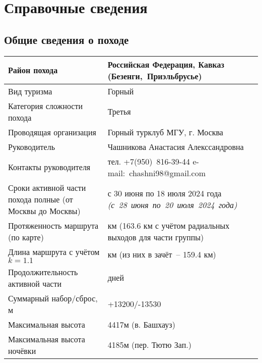 \section{Справочные сведения}\label{sec:general_information}
	\subsection{Общие сведения о походе}\label{subsec:general_information}
		\begin{longtable}{|>{\centering\arraybackslash} m{6.1cm}|>{\centering\arraybackslash} m{10cm}|} \hline
			Район похода														&	Российская Федерация, Кавказ (Безенги,~Приэльбрусье)						\\ \hline
			Вид туризма															&	Горный																		\\ \hline
			Категория сложности похода											&	Третья																		\\ \hline
			Проводящая организация												&	Горный турклуб МГУ, г. Москва												\\ \hline
			Руководитель														&	Чашникова Анастасия Алекссандровна 											\\ \hline
			Контакты руководителя												&	тел. +7(950)~816-39-44 e-mail:~chashni98@gmail.com 							\\ \hline
			Сроки активной части похода полные \newline (от Москвы до Москвы)	&	с 30 июня по 18 июля 2024 года \textit{(с~28~июня~по~20~июля~2024~года)}	\\ \hline
			Протяженность маршрута (по карте)									&	158.1 км (163.6 км с учётом радиальных выходов для части группы)			\\ \hline
			Длина маршрута с учётом $k = 1.1$									&	180 км (из них в зачёт~-- 159.4 км)											\\ \hline
			Продолжительность активной части									&	19 дней																	\\ \hline
																			
			Суммарный набор/сброс, м											&	+13200/-13530																\\ \hline
			Максимальная высота													&	4417м (в. Башхауз)															\\ \hline
			Максимальная высота ночёвки											&	4185м (пер. Тютю Зап.)														\\ \hline
		\end{longtable}
	
	
